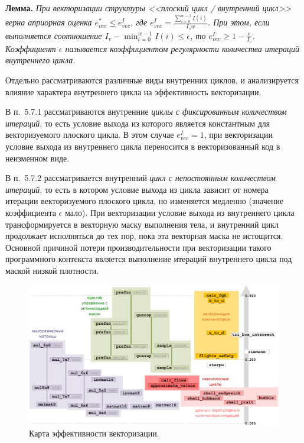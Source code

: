 \documentclass[a4paper,14pt]{extarticle}                     %
\theoremstyle{plain}                                         %
\begin{document}
\textbf{Лемма.} \textit{При векторизации структуры <<плоский цикл / внутренний цикл>> верна априорная оценка $e_{vec}^{*} \le e_{vec}^I$, где $e_{vec}^I = \frac{\sum_{i = 0}^{w - 1}{I(i)}}{I_v w}$.
При этом, если выполняется соотношение $I_v - \min_{i = 0}^{w - 1}{I(i)} \le \epsilon$, то $e_{vec}^I \ge 1 - \frac{\epsilon}{I_v}$. Коэффициент $\epsilon$ называется коэффициентом регулярности количества итераций внутреннего цикла.}

Отдельно рассматриваются различные виды внутренних циклов, и анализируется влияние характера внутреннего цикла на эффективность векторизации.

В п.~5.7.1 рассматриваются внутренние \textit{циклы с фиксированным количеством итераций}, то есть условие выхода из которого является константным для векторизуемого плоского цикла.
В этом случае $e_{vec}^I = 1$, при векторизации условие выхода из внутреннего цикла переносится в векторизованный код в неизменном виде.

В п.~5.7.2 рассматривается внутренний \textit{цикл с непостоянным количеством итераций}, то есть в котором условие выхода из цикла зависит от номера итерации векторизуемого плоского цикла, но изменяется медленно (значение коэффициента $\epsilon$ мало).
При векторизации условие выхода из внутреннего цикла трансформируется в векторную маску выполнения тела, и внутренний цикл продолжает исполняться до тех пор, пока эта векторная маска не истощится.
Основной причиной потери производительности при векторизации такого программного контекста является выполнение итераций внутреннего цикла под маской низкой плотности.

\begin{figure}[!ht]
\centering
\includegraphics[width=1.0\textwidth]{./fig/vec_fin_map.pdf}
\singlespacing
\caption{Карта эффективности векторизации.}
\label{fig:vec_fin_map}
\end{figure}
\end{document}
